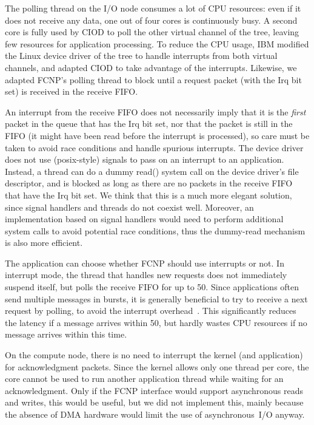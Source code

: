 \documentclass[journal]{IEEEtran}
\begin{document}
The polling thread on the I/O node consumes a lot of CPU resources: even if it
does not receive any data, one out of four cores is continuously busy.
A second core is fully used by CIOD to poll the other virtual channel of the
tree, leaving few resources for application processing.
To reduce the CPU usage, IBM modified the Linux device driver of the tree to
handle interrupts from both virtual channels, and adapted CIOD to take
advantage of the interrupts.
Likewise, we adapted FCNP's polling thread to block until a request packet
(with the Irq bit set) is received in the receive FIFO.

An interrupt from the receive FIFO does not necessarily imply that it is the
\emph{first\/} packet in the queue that has the Irq bit set, nor that the
packet is still in the FIFO (it might have been read before the interrupt is
processed), so care must be taken to avoid race conditions and handle spurious
interrupts.
The device driver does not use (posix-style) signals to pass on an interrupt
to an application.
Instead, a thread can do a dummy read() system call on the device driver's
file descriptor, and is blocked as long as there are no packets in the
receive FIFO that have the Irq bit set.
We think that this is a much more elegant solution, since signal handlers and
threads do not coexist well.
Moreover, an implementation based on signal handlers would need to perform
additional system calls to avoid potential race conditions, thus the dummy-read
mechanism is also more efficient.

The application can choose whether FCNP should use interrupts or not.
In interrupt mode, the thread that handles new requests does not immediately
suspend itself, but polls the receive FIFO for up to 50\us.
Since applications often send multiple messages in bursts,
it is generally beneficial to try to receive a next request by polling,
to avoid the interrupt overhead~\cite{Langendoen:96}.
This significantly reduces the latency if a message arrives within 50\us,
but hardly wastes CPU resources if no message arrives within this time.

On the compute node, there is no need to interrupt the kernel (and application)
for acknowledgment packets.
Since the kernel allows only one thread per core, the core cannot be used to
run another application thread while waiting for an acknowledgment.
Only if the FCNP interface would support asynchronous reads and writes, this
would be useful, but we did not implement this, mainly because the absence of
DMA hardware would limit the use of asynchronous~I/O anyway.
\end{document}
